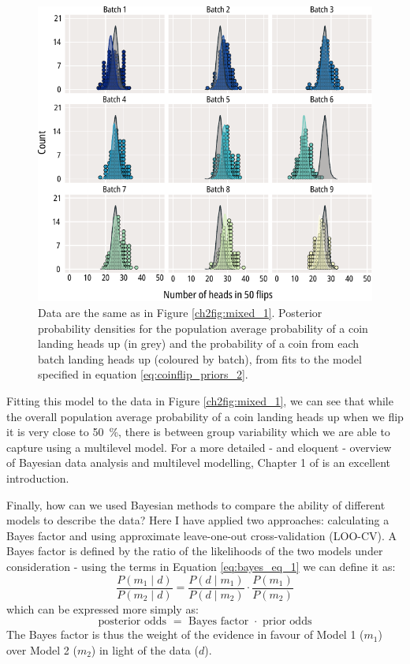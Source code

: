 \begin{figure}
	\centering
	\includegraphics[width=\textwidth]{coinflip_mixed_2.pdf}
	\caption[Multilevel modelling of coinflips - fitting the model]{
		Data are the same as in Figure \ref{ch2fig:mixed_1}.
		Posterior probability densities for the population average probability of a coin landing heads up (in grey) and the probability of a coin from each batch landing heads up (coloured by batch), from fits to the model specified in equation \ref{eq:coinflip_priors_2}.
	}\label{ch2fig:mixed_2}
\end{figure}

Fitting this model to the data in Figure \ref{ch2fig:mixed_1}, we can see that while the overall population average probability of a coin landing heads up when we flip it is very close to \SI{50}{\percent}, there is between group variability which we are able to capture using a multilevel model.
For a more detailed - and eloquent - overview of Bayesian data analysis and multilevel modelling, Chapter 1 of \textcite{mcelreath_statistical_2020} is an excellent introduction.

Finally, how can we used Bayesian methods to compare the ability of different models to describe the data?
Here I have applied two approaches: calculating a Bayes factor and using approximate leave-one-out cross-validation (LOO-CV).
A Bayes factor is defined by the ratio of the likelihoods of the two models under consideration - using the terms in Equation \ref{eq:bayes_eq_1} we can define it as:
\begin{equation}\label{eq:bayes_eq_2}
\frac{P(m_1 \mid d)}{P(m_2 \mid d)} = \frac{P(d \mid m_1)}{P(d \mid m_2)} \cdot \frac{P(m_1)}{P(m_2)}
\end{equation}
which can be expressed more simply as:
\begin{equation*}
\textrm{posterior odds } = \textrm{ Bayes factor } \cdot \textrm{ prior odds}
\end{equation*}
The Bayes factor is thus the weight of the evidence in favour of Model 1 ($m_1$) over Model 2 ($m_2$) in light of the data ($d$).


